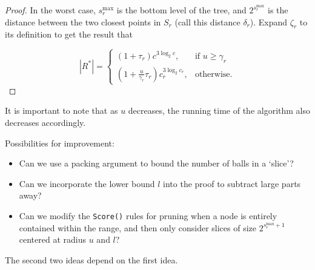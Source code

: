 \begin{proof}
In the worst case, $s_r^{\max}$ is the bottom level of the tree, and
$2^{s_r^{\max}}$ is the distance between the two closest points in $S_r$ (call
this distance $\delta_r$).  Expand $\zeta_r$ to its definition to get the result
that

\begin{equation}
|R^*| =
\begin{cases}
  (1 + \tau_r) c^{3 \log_2 c},& \text{if } u \ge \gamma_r \\
  (1 + \frac{u}{\gamma_r} \tau_r) c_r^{3 \log_2 c_r},& \text{otherwise}.
\end{cases}
\end{equation}

\end{proof}

It is important to note that as $u$ decreases, the running time of the algorithm
also decreases accordingly.

Possibilities for improvement:

\begin{itemize}
  \item Can we use a packing argument to bound the number of balls in a `slice'?

  \item Can we incorporate the lower bound $l$ into the proof to subtract large
parts away?

  \item Can we modify the \texttt{Score()} rules for pruning when a node is
entirely contained within the range, and then only consider slices of size
$2^{s_r^{\max} + 1}$ centered at radius $u$ and $l$?
\end{itemize}

The second two ideas depend on the first idea.
